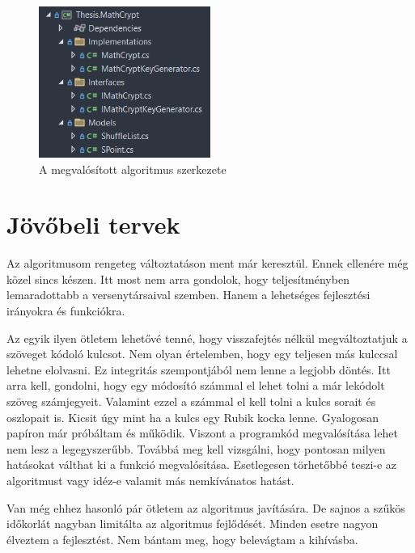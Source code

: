 \documentclass[12pt]{report} %
\begin{document}
\begin{figure}[H]
    \centering %
    \includegraphics[width=0.5\textwidth]{Figures/MyAlgorithm5.png} %
    \caption{A megvalósított algoritmus szerkezete} %
    \label{fig:MyAlgorithm5} %
\end{figure}

\section{Jövőbeli tervek} %

Az algoritmusom rengeteg változtatáson ment már keresztül. Ennek ellenére még közel sincs készen. Itt most nem arra gondolok, hogy teljesítményben lemaradottabb a versenytársaival szemben. Hanem a lehetséges fejlesztési irányokra és funkciókra.

Az egyik ilyen ötletem lehetővé tenné, hogy visszafejtés nélkül megváltoztatjuk a szöveget kódoló kulcsot. Nem olyan értelemben, hogy egy teljesen más kulccsal lehetne elolvasni. Ez integritás szempontjából nem lenne a legjobb döntés. Itt arra kell, gondolni, hogy egy módosító számmal el lehet tolni a már lekódolt szöveg számjegyeit. Valamint ezzel a számmal el kell tolni a kulcs sorait és oszlopait is. Kicsit úgy mint ha a kulcs egy Rubik kocka lenne. Gyalogosan papíron már próbáltam és működik. Viszont a programkód megvalósítása lehet nem lesz a legegyszerűbb. Továbbá meg kell vizsgálni, hogy pontosan milyen hatásokat válthat ki a funkció megvalósítása. Esetlegesen törhetőbbé teszi-e az algoritmust vagy idéz-e valamit más nemkívánatos hatást.

Van még ehhez hasonló pár ötletem az algoritmus javítására. De sajnos a szűkös időkorlát nagyban limitálta az algoritmus fejlődését. Minden esetre nagyon élveztem a fejlesztést. Nem bántam meg, hogy belevágtam a kihívásba.
\end{document}
